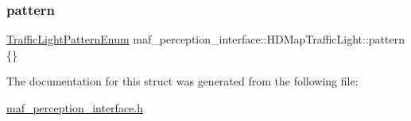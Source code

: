 \subsubsection{\texorpdfstring{pattern}{pattern}}
{\footnotesize\ttfamily \hyperlink{structmaf__perception__interface_1_1TrafficLightPatternEnum}{Traffic\+Light\+Pattern\+Enum} maf\+\_\+perception\+\_\+interface\+::\+H\+D\+Map\+Traffic\+Light\+::pattern \{\}}



The documentation for this struct was generated from the following file\+:\begin{DoxyCompactItemize}
\item 
\hyperlink{maf__perception__interface_8h}{maf\+\_\+perception\+\_\+interface.\+h}\end{DoxyCompactItemize}
